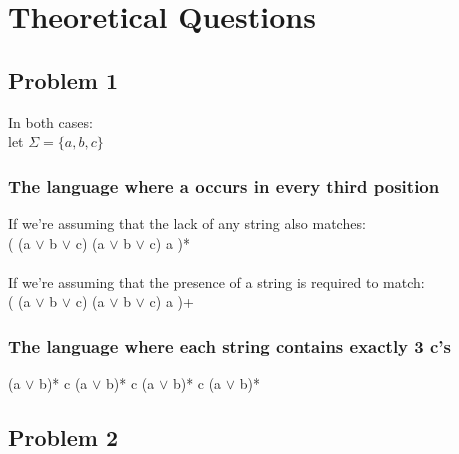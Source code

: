 
\usepackage{algorithm}
\usepackage{listings}
\usepackage{graphicx,amssymb,amsmath}
\usepackage{epstopdf}
\sloppy

\oddsidemargin -0.5in
\evensidemargin -0.5in
\textwidth 7.5in
\topmargin -0.5in
\textheight 9.0in




\pagestyle{myheadings}  %
	 	
\section{Theoretical Questions}

\subsection{Problem 1}

In both cases: \\
let \( \Sigma = \{ a, b, c \} \)

\subsubsection{The language where a occurs in every third position}

If we're assuming that the lack of any string also matches: \\
( (a \(\vee\) b \(\vee\) c) (a \(\vee\) b \(\vee\) c) a )* \\ \\ If we're assuming that the presence of a string is required to match: \\
( (a \(\vee\) b \(\vee\) c) (a \(\vee\) b \(\vee\) c) a )+ \\

\subsubsection{The language where each string contains exactly 3 c's}
(a \(\vee\) b)* c (a \(\vee\) b)* c (a \(\vee\) b)* c (a \(\vee\) b)*

\subsection{Problem 2}

